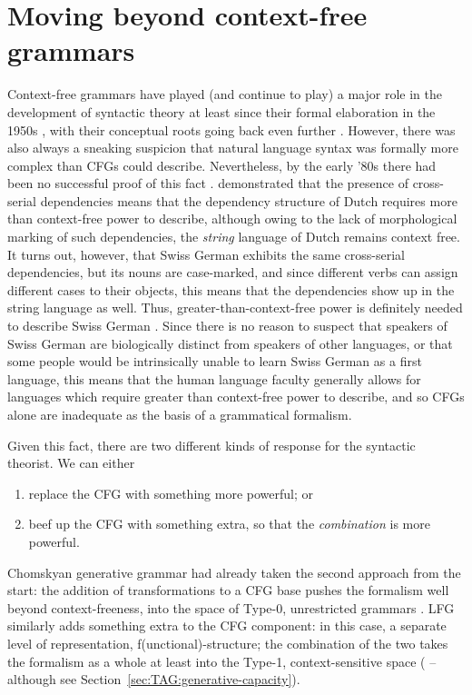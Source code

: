 \documentclass[output=paper,hidelinks]{langscibook}
\begin{document}
\section{Moving beyond context-free grammars}\label{sec:TAG:beyond-cfg}
%
Context-free grammars have played (and continue to play) a major role in the
development of syntactic theory at least since their formal elaboration in the
1950s \citep{chom:56}, with their conceptual roots going back even further
\citep[at least to e.g.][]{Harris1946,wells1947}. However, there was also always
a sneaking suspicion that natural language syntax was formally more complex than
CFGs could describe. Nevertheless, by the early '80s there had been no
successful proof of this fact \citep{pullum-gazdar1982}. 
\citet{BKPZ:Dutch} demonstrated that the presence of cross-serial dependencies
means that the dependency structure of Dutch requires more than context-free
power to describe, although owing to the lack of morphological marking of such
dependencies, the \emph{string} language of Dutch remains context free. It turns
out, however, that Swiss German exhibits the same cross-serial dependencies, but
its nouns are case-marked, and since different verbs can assign different cases
to their objects, this means that the dependencies show up in the string
language as well. Thus, greater-than-context-free power is definitely needed to
describe Swiss German \citep{Shieber1985}. Since there is no reason to suspect
that speakers of Swiss German are biologically distinct from speakers of other
languages, or that some people would be intrinsically unable to learn Swiss
German as a first language, this means that the human language faculty generally
allows for languages which require greater than context-free power to describe,
and so CFGs alone are inadequate as the basis of a grammatical formalism.

Given this fact, there are two different kinds of response for the syntactic
theorist. We can either

\begin{enumerate}
  \item replace the CFG with something more powerful; or
  \item beef up the CFG with something extra, so that the \emph{combination} is
        more powerful.
\end{enumerate}
%
Chomskyan generative grammar had already taken the second approach from the
start: the addition of transformations to a CFG base pushes the formalism well
beyond context-freeness, into the space of Type-0, unrestricted grammars
\citep{peters:generative-power}. LFG similarly adds something extra to the CFG
component: in this case, a separate level of representation,
f(unctional)-structure; the combination of the two takes the formalism as a
whole at least into the Type-1, context-sensitive space (\citealp{Berwick1982}
-- although see Section~\ref{sec:TAG:generative-capacity}).
\end{document}
